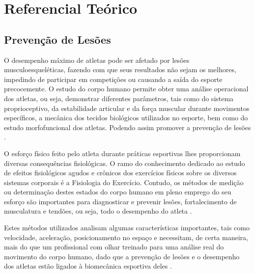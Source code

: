 
\chapter[Referencial Teórico]{Referencial Teórico}

\section{Prevenção de Lesões}

O desempenho máximo de atletas pode ser afetado por lesões musculoesqueléticas, fazendo com que seus resultados não sejam os melhores, impedindo de participar em competições ou causando a saída do esporte precocemente. O estudo do corpo humano permite obter uma análise operacional dos atletas, ou seja, demonstrar diferentes parâmetros, tais como do sistema proprioceptivo, da estabilidade articular e da força muscular durante movimentos específicos, a mecânica dos tecidos biológicos utilizados no esporte, bem como do estudo morfofuncional dos atletas. Podendo assim promover a prevenção de lesões \cite{miziara2014}.  

O esforço físico feito pelo atleta durante práticas esportivas lhes proporcionam diversas consequências fisiológicas. O ramo do conhecimento dedicado ao estudo de efeitos fisiológicos agudos e crônicos dos exercícios físicos sobre os diversos sistemas corporais é a Fisiologia do Exercício. Contudo, os métodos de medição ou determinação destes estados do corpo humano em pleno emprego do seu esforço são importantes para diagnosticar e prevenir lesões, fortalecimento de musculatura e tendões, ou seja, todo o desempenho do atleta \cite{rocha2005}.

Estes métodos utilizados analisam algumas características importantes, tais como velocidade, aceleração, posicionamento no espaço e necessitam, de certa maneira, mais do que um profissional com olhar treinado para uma análise real do movimento do corpo humano, dado que a prevenção de lesões e o desempenho dos atletas estão ligados à biomecânica esportiva deles \cite{amadio2000}.

